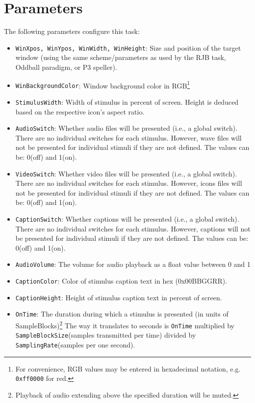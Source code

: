 \documentclass[letterpaper,oneside,12pt]{article}
\begin{document}
\section{Parameters}
The following parameters configure this task:
\begin{itemize}
 \item {\tt WinXpos, WinYpos, WinWidth, WinHeight}: Size and position of the target window (using the same scheme/parameters 
       as used by the RJB task, Oddball paradigm, or P3 speller).
 \item {\tt WinBackgroundColor}: Window background color in RGB\footnote{For convenience, RGB values
       may be entered in hexadecimal notation, e.g. \texttt{0xff0000} for red.}
 \item {\tt StimulusWidth}: Width of stimulus in percent of screen. Height is deduced based on the respective icon's aspect ratio.
 \item {\tt AudioSwitch}: Whether audio files will be presented
       (i.e., a global switch). There are no individual switches for each stimulus. However,
       wave files will not be presented for individual stimuli if they are not defined. The values can be: 0(off) and 1(on).
 \item {\tt VideoSwitch}: Whether video files will be presented
       (i.e., a global switch). There are no individual switches for each stimulus. However,
       icons files will not be presented for individual stimuli if they are not defined. The values can be: 0(off) and 1(on).
 \item {\tt CaptionSwitch}: Whether captions will be presented
       (i.e., a global switch). There are no individual switches for each stimulus. However,
       captions will not be presented for individual stimuli if they are not defined. The values can be: 0(off) and 1(on).
 \item {\tt AudioVolume}: The volume for audio playback as a float value between 0 and 1
 \item {\tt CaptionColor}: Color of stimulus caption text in hex (0x00BBGGRR).
 \item {\tt CaptionHeight}: Height of stimulus caption text in percent of screen.
 \item {\tt OnTime}: The duration during which a stimulus is presented (in units of
       SampleBlocks)\footnote{Playback of audio extending above the specified duration 
       will be muted.} The way it translates to seconds is {\tt OnTime} multiplied by {\tt SampleBlockSize}(samples transmitted per time) divided by {\tt SamplingRate}(samples per one second).

\end{itemize}
\end{document}
